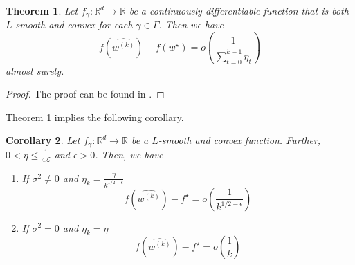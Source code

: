 \documentclass[12pt]{article}
\newtheorem{theorem}{Theorem}[section]
\newtheorem{corollary}[theorem]{Corollary}
\theoremstyle{definition}
\newtheorem{assumption}[theorem]{Assumption}
\numberwithin{equation}{section}
\newcommand{\R}{\mathbb{R}}
\newcommand{\CL}{\mathcal{L}}
\begin{document}
\begin{theorem}
  \label{thm:almost_sure_convergence}
  Let $f_{\gamma} : \R^d \rightarrow \R$ be a continuously differentiable function that is both $L$-smooth and convex for each $\gamma \in \Gamma$. Then we have 
  \begin{equation*}
    f(\widehat{w^{(k)}}) - f(w^\star) = o\left(\frac{1}{\sum_{t=0}^{k-1}\eta_t}\right)
  \end{equation*}
  almost surely.
\end{theorem}
\begin{proof}
  The proof can be found in \autocite{sebbouhAlmostSureConvergence2021}.
\end{proof}
Theorem \ref{thm:almost_sure_convergence} implies the following corollary.
\begin{corollary}
  Let $f_{\gamma}: \R^d \rightarrow \R$ be a $L$-smooth and convex function. Further, $0 < \eta \leq \frac{1}{4\CL}$ and $\epsilon > 0 $. Then, we have
  \begin{enumerate}
    \item If $\sigma^2 \neq 0$ and $\eta_k = \frac{\eta}{k^{1/2+\epsilon}}$
    \begin{equation*}
      f(\widehat{w^{(k)}}) - f^\star = o\left(\frac{1}{k^{1/2-\epsilon}}\right)
    \end{equation*}
    \item If $\sigma^2 = 0$ and $\eta_k = \eta$
    \begin{equation*}
      f(\widehat{w^{(k)}}) - f^\star = o\left(\frac{1}{k}\right)
    \end{equation*}
  \end{enumerate}
\end{corollary}
\end{document}
